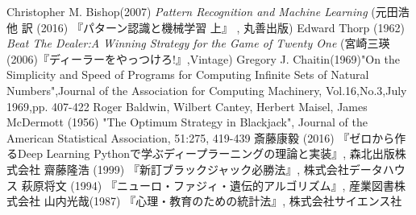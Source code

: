 \begin{thebibliography}{9}
   Christopher M. Bishop(2007) {\it{Pattern Recognition and Machine Learning}} (元田浩 他 訳 (2016) 『パターン認識と機械学習 上』 , 丸善出版)
   Edward Thorp (1962) {\it{Beat The Dealer:A Winning Strategy for the Game of Twenty One}} (宮崎三瑛(2006)『ディーラーをやっつけろ!』,Vintage)
   Gregory J. Chaitin(1969)"On the Simplicity and Speed of Programs for Computing Infinite Sets of Natural Numbers",Journal of the Association for Computing Machinery, Vol.16,No.3,July 1969,pp. 407-422
   Roger Baldwin, Wilbert Cantey, Herbert Maisel, James McDermott (1956) "The Optimum Strategy in Blackjack", Journal of the American Statistical Association, 51:275, 419-439
   斎藤康毅 (2016) 『ゼロから作るDeep Learning Pythonで学ぶディープラーニングの理論と実装』, 森北出版株式会社
   齋藤隆浩 (1999) 『新訂ブラックジャック必勝法』, 株式会社データハウス
   萩原将文 (1994) 『ニューロ・ファジィ・遺伝的アルゴリズム』, 産業図書株式会社
   山内光哉(1987) 『心理・教育のための統計法』, 株式会社サイエンス社
\end{thebibliography}
